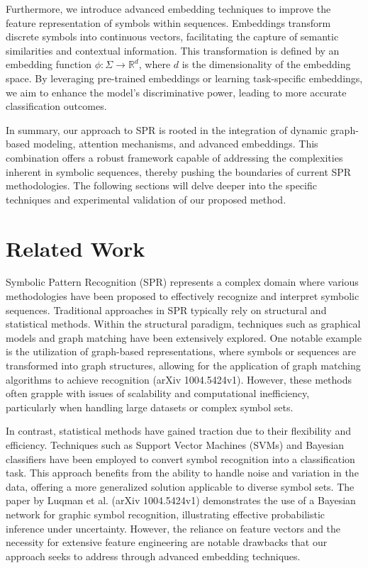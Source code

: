 \documentclass{article}
\begin{document}
Furthermore, we introduce advanced embedding techniques to improve the feature representation of symbols within sequences. Embeddings transform discrete symbols into continuous vectors, facilitating the capture of semantic similarities and contextual information. This transformation is defined by an embedding function \( \phi: \Sigma \rightarrow \mathbb{R}^d \), where \( d \) is the dimensionality of the embedding space. By leveraging pre-trained embeddings or learning task-specific embeddings, we aim to enhance the model's discriminative power, leading to more accurate classification outcomes.

In summary, our approach to SPR is rooted in the integration of dynamic graph-based modeling, attention mechanisms, and advanced embeddings. This combination offers a robust framework capable of addressing the complexities inherent in symbolic sequences, thereby pushing the boundaries of current SPR methodologies. The following sections will delve deeper into the specific techniques and experimental validation of our proposed method.

\section{Related Work}
Symbolic Pattern Recognition (SPR) represents a complex domain where various methodologies have been proposed to effectively recognize and interpret symbolic sequences. Traditional approaches in SPR typically rely on structural and statistical methods. Within the structural paradigm, techniques such as graphical models and graph matching have been extensively explored. One notable example is the utilization of graph-based representations, where symbols or sequences are transformed into graph structures, allowing for the application of graph matching algorithms to achieve recognition (arXiv 1004.5424v1). However, these methods often grapple with issues of scalability and computational inefficiency, particularly when handling large datasets or complex symbol sets.

In contrast, statistical methods have gained traction due to their flexibility and efficiency. Techniques such as Support Vector Machines (SVMs) and Bayesian classifiers have been employed to convert symbol recognition into a classification task. This approach benefits from the ability to handle noise and variation in the data, offering a more generalized solution applicable to diverse symbol sets. The paper by Luqman et al. (arXiv 1004.5424v1) demonstrates the use of a Bayesian network for graphic symbol recognition, illustrating effective probabilistic inference under uncertainty. However, the reliance on feature vectors and the necessity for extensive feature engineering are notable drawbacks that our approach seeks to address through advanced embedding techniques.
\end{document}
